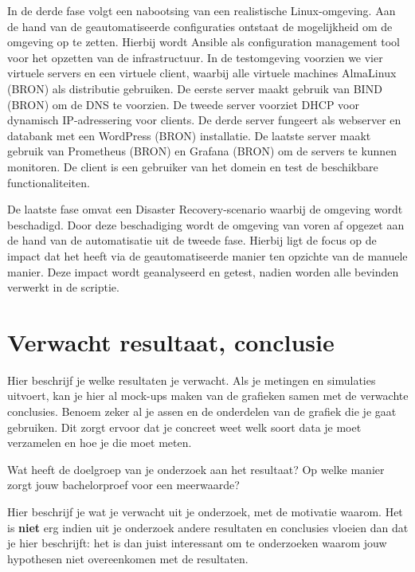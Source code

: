 In de derde fase volgt een nabootsing van een realistische Linux-omgeving. Aan de hand van de geautomatiseerde configuraties ontstaat de mogelijkheid om de omgeving op te zetten. Hierbij wordt Ansible als configuration management tool voor het opzetten van de infrastructuur. In de testomgeving voorzien we vier virtuele servers en een virtuele client, waarbij alle virtuele machines AlmaLinux (BRON) als distributie gebruiken. De eerste server maakt gebruik van BIND (BRON) om de DNS te voorzien. De tweede server voorziet DHCP voor dynamisch IP-adressering voor clients. De derde server fungeert als webserver en databank met een WordPress (BRON) installatie. De laatste server maakt gebruik van Prometheus (BRON) en Grafana (BRON) om de servers te kunnen monitoren. De client is een gebruiker van het domein en test de beschikbare functionaliteiten.

De laatste fase omvat een Disaster Recovery-scenario waarbij de omgeving wordt beschadigd. Door deze beschadiging wordt de omgeving van voren af opgezet aan de hand van de automatisatie uit de tweede fase. Hierbij ligt de focus op de impact dat het heeft via de geautomatiseerde manier ten opzichte van de manuele manier. Deze impact wordt geanalyseerd en getest, nadien worden alle bevinden verwerkt in de scriptie.


\section{Verwacht resultaat, conclusie}%
\label{sec:verwachte_resultaten}

Hier beschrijf je welke resultaten je verwacht. Als je metingen en simulaties uitvoert, kan je hier al mock-ups maken van de grafieken samen met de verwachte conclusies. Benoem zeker al je assen en de onderdelen van de grafiek die je gaat gebruiken. Dit zorgt ervoor dat je concreet weet welk soort data je moet verzamelen en hoe je die moet meten.

Wat heeft de doelgroep van je onderzoek aan het resultaat? Op welke manier zorgt jouw bachelorproef voor een meerwaarde?

Hier beschrijf je wat je verwacht uit je onderzoek, met de motivatie waarom. Het is \textbf{niet} erg indien uit je onderzoek andere resultaten en conclusies vloeien dan dat je hier beschrijft: het is dan juist interessant om te onderzoeken waarom jouw hypothesen niet overeenkomen met de resultaten.

